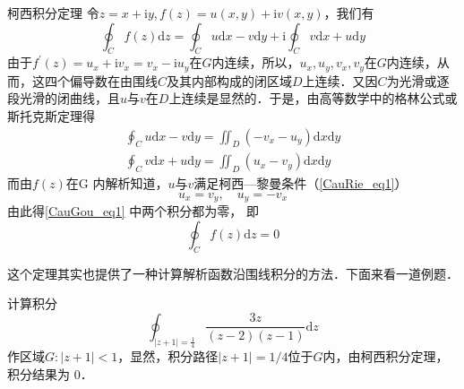 \begin{theorem}{柯西积分定理}
令$z=x+\mathrm{i} y, f(z)=u(x, y)+\mathrm{i} v(x, y)$，我们有
\begin{equation}
\oint_{C} f(z) \mathrm{d} z=\oint_{C} u \mathrm{d} x-v \mathrm{d} y+\mathrm{i} \oint_{C} v \mathrm{d} x+u \mathrm{d} y
\end{equation}
由于$f^{\prime}(z)=u_{x}+\mathrm{i} v_{x}=v_{x}-\mathrm{i} u_{y}$在$G $内连续，所以，$u_{x}, u_{y}, v_{x}, v_{y}$在$G $内连续，从而，这四个偏导数在由围线$C$及其内部构成的闭区域$D $上连续．又因$C $为光滑或逐段光滑的闭曲线，且$u $与$v $在$D $上连续是显然的．于是，由高等数学中的格林公式或斯托克斯定理得
\begin{equation}\label{CauGou_eq1}
\begin{aligned}\oint_C u \mathrm{d} x-v \mathrm{d} y=\iint_{D}\left(-v_{x}-u_{y}\right) \mathrm{d} x \mathrm{d} y \\ \oint_C v \mathrm{d} x+u \mathrm{d} y=\iint_{D}\left(u_{x}-v_{y}\right) \mathrm{d} x \mathrm{d} y\end{aligned}
\end{equation}
而由$ f (z)$在G 内解析知道，$u$与$v$满足柯西—黎曼条件（\autoref{CauRie_eq1}）
\begin{equation}
u_{x}=v_{y}, \quad u_{y}=-v_{x}
\end{equation}
由此得\autoref{CauGou_eq1} 中两个积分都为零， 即
\begin{equation}
\oint_{C} f(z) \mathrm{d} z=0
\end{equation}
\end{theorem}
这个定理其实也提供了一种计算解析函数沿围线积分的方法．下面来看一道例题．
\begin{example}{}
计算积分
\begin{equation}
\oint_{|z+1|=\frac{1}{4}} \frac{3 z}{(z-2)(z-1)} \mathrm{d} z
\end{equation}
作区域$G:|z+1|<1$，显然，积分路径$|z+1|=1/4$位于$G$内，由柯西积分定理， 积分结果为 0．
\end{example}
